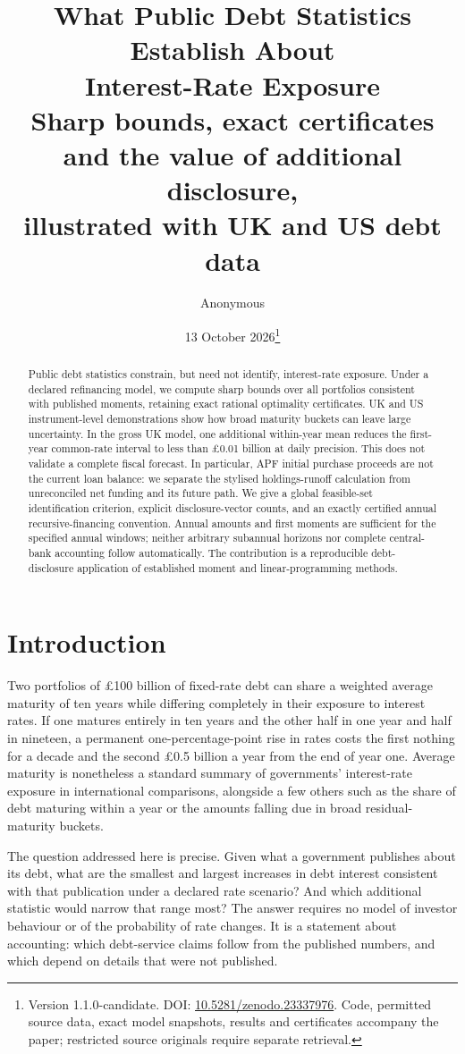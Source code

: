 \documentclass[11pt,a4paper]{article}
\title{What Public Debt Statistics Establish About\\Interest-Rate Exposure\\[4pt]
\large Sharp bounds, exact certificates and the value of additional disclosure,\\ illustrated with UK and US debt data}
\author{Anonymous}
\date{13 October 2026\thanks{Version 1.1.0-candidate. DOI: \href{https://doi.org/10.5281/zenodo.23337976}{10.5281/zenodo.23337976}. Code, permitted source data, exact model snapshots, results and certificates accompany the paper; restricted source originals require separate retrieval.}}
\theoremstyle{remark}
\begin{document}
\maketitle

\begin{abstract}
\noindent
Public debt statistics constrain, but need not identify, interest-rate exposure. Under a declared refinancing model, we compute sharp bounds over all portfolios consistent with published moments, retaining exact rational optimality certificates. UK and US instrument-level demonstrations show how broad maturity buckets can leave large uncertainty. In the gross UK model, one additional within-year mean reduces the first-year common-rate interval to less than £0.01 billion at daily precision. This does not validate a complete fiscal forecast. In particular, APF initial purchase proceeds are not the current loan balance: we separate the stylised holdings-runoff calculation from unreconciled net funding and its future path. We give a global feasible-set identification criterion, explicit disclosure-vector counts, and an exactly certified annual recursive-financing convention. Annual amounts and first moments are sufficient for the specified annual windows; neither arbitrary subannual horizons nor complete central-bank accounting follow automatically. The contribution is a reproducible debt-disclosure application of established moment and linear-programming methods.
\end{abstract}

\section{Introduction}

Two portfolios of £100 billion of fixed-rate debt can share a weighted average maturity of ten years while differing completely in their exposure to interest rates. If one matures entirely in ten years and the other half in one year and half in nineteen, a permanent one-percentage-point rise in rates costs the first nothing for a decade and the second £0.5 billion a year from the end of year one. Average maturity is nonetheless a standard summary of governments' interest-rate exposure in international comparisons, alongside a few others such as the share of debt maturing within a year or the amounts falling due in broad residual-maturity buckets.

The question addressed here is precise. Given what a government publishes about its debt, what are the smallest and largest increases in debt interest consistent with that publication under a declared rate scenario? And which additional statistic would narrow that range most? The answer requires no model of investor behaviour or of the probability of rate changes. It is a statement about accounting: which debt-service claims follow from the published numbers, and which depend on details that were not published.
\end{document}

